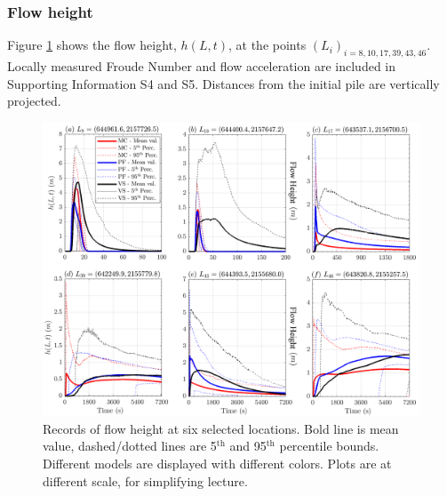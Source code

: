 \documentclass{article}
\begin{document}
\subsubsection{Flow height}
Figure \ref{fig:Colima-H} shows the flow height, $h(L,t)$, at the points $(L_i)_{i=8,10,17,39,43,46}$. Locally measured Froude Number and flow acceleration are included in Supporting Information S4 and S5. Distances from the initial pile are vertically projected.
\begin{figure}[H]
         \centering
        \includegraphics[width=1\textwidth]{BAF_VolcanDeColima/LocalMeasurments/Height.png}
        \caption{Records of flow height at six selected locations. Bold line is mean value, dashed/dotted lines are 5$^{\mathrm{th}}$ and 95$^{\mathrm{th}}$ percentile bounds. Different models are displayed with different colors. Plots are at different scale, for simplifying lecture.}
        \label{fig:Colima-H}
\end{figure}
\end{document}
